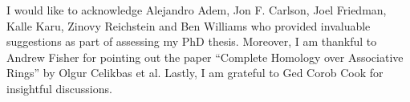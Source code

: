 \documentclass[12pt,a4paper]{article}
\numberwithin{equation}{section}
\theoremstyle{nonumberplain}
\begin{document}
I would like to acknowledge Alejandro Adem, Jon F.\! Carlson, Joel Friedman, Kalle Karu, Zinovy Reichstein and Ben Williams who provided invaluable suggestions as part of assessing my PhD thesis. Moreover, I am thankful to Andrew Fisher for pointing out the paper ``Complete Homology over Associative Rings'' by Olgur Celikbas et al. Lastly, I am grateful to Ged Corob Cook for insightful discussions.

\renewcommand{\bibname}{References}
\end{document}
